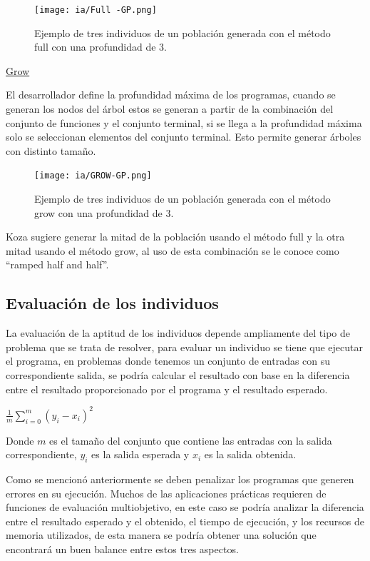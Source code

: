 \documentclass[11pt,fleqn]{book} %
\begin{document}
\begin{figure}[ht]
\centering\texttt{[image: ia/Full -GP.png]}
\caption{Ejemplo de tres individuos de un población generada con el método full con una profundidad de 3.}
\label{fig:Full-GP} 
\end{figure}

\underline{Grow}

El desarrollador define la profundidad máxima de los programas, cuando se generan los nodos del árbol estos se generan a partir de la combinación del conjunto de funciones y el conjunto terminal, si se llega a la profundidad máxima solo se seleccionan elementos del conjunto terminal. Esto permite generar árboles con distinto tamaño.

\begin{figure}[ht]
\centering\texttt{[image: ia/GROW-GP.png]}
\caption{Ejemplo de tres individuos de un población generada con el método grow con una profundidad de 3.}
\label{fig:GROW-GP} 
\end{figure}

Koza \cite{koza1992genetic} sugiere generar la mitad de la población usando el método full y la otra mitad usando el método grow, al uso de esta combinación se le conoce como “ramped half and half”.

\subsection{Evaluación de los individuos} 

La evaluación de la aptitud de los individuos depende ampliamente del tipo de problema que se trata de resolver, para evaluar un individuo se tiene que ejecutar el programa, en problemas donde tenemos un conjunto de entradas con su correspondiente salida, se podría calcular el resultado con base en la diferencia entre el resultado proporcionado por el programa y el resultado esperado.

$\frac{1}{m} \sum_{i=0}^{m}(y_i-x_i)^{2}$

Donde $m$ es el tamaño del conjunto que contiene las entradas con la salida correspondiente, $y_i$ es la salida esperada y $x_i$ es la salida obtenida.

Como se mencionó anteriormente se deben penalizar los programas que generen errores en su ejecución.
Muchos de las aplicaciones prácticas requieren de funciones de evaluación multiobjetivo, en este caso se podría analizar la diferencia entre el resultado esperado y el obtenido, el tiempo de ejecución, y los recursos de memoria utilizados, de esta manera se podría obtener una solución que encontrará un buen balance entre estos tres aspectos.
\end{document}
